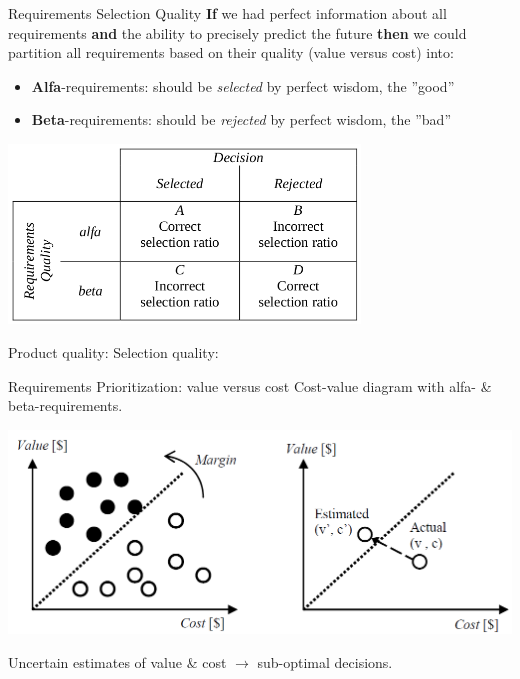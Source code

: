\documentclass{simpleslides}
\begin{document}
\begin{frame}[fragile]{Requirements Selection Quality}
\footnotesize
\textbf{If} we had perfect information about all requirements \textbf{and} the ability to precisely predict the future \textbf{then} we could partition all requirements based on their quality (value versus cost) into:
\begin{itemize}\footnotesize
\item \textbf{Alfa}-requirements: should be \textit{selected} by perfect wisdom, the ''good''
\item \textbf{Beta}-requirements: should be \textit{rejected} by perfect wisdom, the ''bad''
\end{itemize}
\begin{center}
\includegraphics[width=0.7\textwidth]{img/alfa-beta-reqts}
\end{center}
{
Product quality: \hfill
Selection quality:
}
\end{frame}

\begin{frame}[fragile]{Requirements Prioritization: value versus cost}
Cost-value diagram with alfa- \& beta-requirements.
\begin{center}
\includegraphics[width=1.0\textwidth]{img/cost-value}
\end{center}
Uncertain estimates of value \& cost $\rightarrow$ sub-optimal decisions.
\end{frame}
\end{document}
